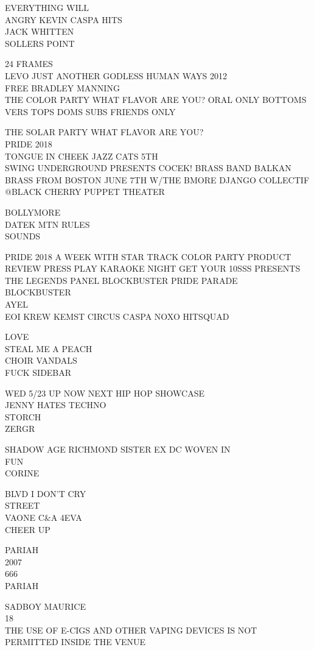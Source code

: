 \documentclass[10pt,letterpaper]{article}
\begin{document}
EVERYTHING WILL\\
ANGRY KEVIN CASPA HITS\\
JACK WHITTEN\\
SOLLERS POINT

24 FRAMES\\
LEVO JUST ANOTHER GODLESS HUMAN WAYS 2012\\
FREE BRADLEY MANNING\\
THE COLOR PARTY WHAT FLAVOR ARE YOU?  ORAL ONLY BOTTOMS VERS TOPS DOMS SUBS FRIENDS ONLY

THE SOLAR PARTY WHAT FLAVOR ARE YOU?\\
PRIDE 2018\\
TONGUE IN CHEEK JAZZ CATS 5TH\\
SWING UNDERGROUND PRESENTS COCEK!  BRASS BAND BALKAN BRASS FROM BOSTON JUNE 7TH W/THE BMORE DJANGO COLLECTIF @BLACK CHERRY PUPPET THEATER

BOLLYMORE\\
DATEK MTN RULES\\
SOUNDS

PRIDE 2018 A WEEK WITH STAR TRACK COLOR PARTY PRODUCT REVIEW PRESS PLAY KARAOKE NIGHT GET YOUR 10SSS PRESENTS THE LEGENDS PANEL BLOCKBUSTER PRIDE PARADE\\
BLOCKBUSTER\\
AYEL\\
EOI KREW KEMST CIRCUS CASPA NOXO HITSQUAD

LOVE\\
STEAL ME A PEACH\\
CHOIR VANDALS\\
FUCK SIDEBAR

WED 5/23 UP NOW NEXT HIP HOP SHOWCASE\\
JENNY HATES TECHNO\\
STORCH\\
ZERGR

SHADOW AGE RICHMOND SISTER EX DC WOVEN IN\\
FUN\\
CORINE

BLVD I DON'T CRY\\
STREET\\
VAONE C\&A 4EVA\\
CHEER UP

PARIAH\\
2007\\
666\\
PARIAH

SADBOY MAURICE\\
18\\
THE USE OF E{-}CIGS AND OTHER VAPING DEVICES IS NOT PERMITTED INSIDE THE VENUE
\end{document}
